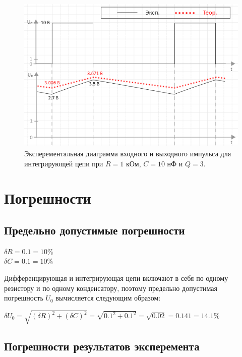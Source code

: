 \begin{figure}[H]
	\begin{center}
		\includegraphics[width=14cm]{img/q3_with_theory}
		\caption{Эксперементальная диаграмма входного и выходного импульса для интегрирующей цепи при $R = 1$ кОм, $C = 10$ нФ и $Q = 3$.}
		\label{i:3} %
	\end{center}
\end{figure}

\section{Погрешности}

\subsection{Предельно допустимые погрешности}

\begin{center}
$\delta R = 0.1 = 10\%$\\
$\delta C = 0.1 = 10\%$\\
\end{center}

Дифференцирующая и интегрирующая цепи включают в себя по одному резистору и по одному конденсатору, поэтому предельно допустимая погрешность $U_0$ вычисляется следующим образом:


$\delta U_0 = \sqrt{(\delta R)^2 + (\delta C)^2} = \sqrt{0.1^2 + 0.1^2} = \sqrt{0.02} = 0.141 = 14.1 \%$

\subsection{Погрешности результатов эксперемента} %

